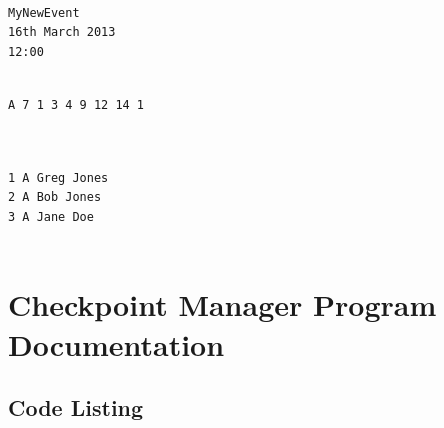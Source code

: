 \documentclass{article}
\begin{document}
\begin{center}
	\begin{lstlisting}[showstringspaces=false, caption={name.txt file output from listing \ref{lst:create-output}}]
	
MyNewEvent
16th March 2013
12:00

	\end{lstlisting}
\end{center}

\begin{center}
	\begin{lstlisting}[showstringspaces=false, caption={courses.txt file output from listing \ref{lst:create-output}}]

A 7 1 3 4 9 12 14 1 
		
	\end{lstlisting}
\end{center}

\begin{center}
	\begin{lstlisting}[showstringspaces=false, caption={entrants.txt file output from listing \ref{lst:create-output}}]

1 A Greg Jones
2 A Bob Jones
3 A Jane Doe	
		
	\end{lstlisting}
\end{center}

\section{Checkpoint Manager Program Documentation}

\subsection{Code Listing}







\end{document}
